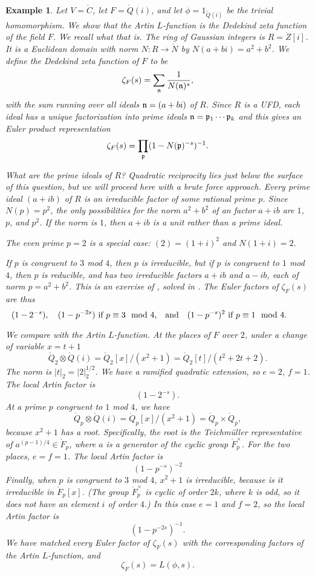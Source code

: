 \documentclass{amsart}
\newtheorem{example}[exercise]{Example}
\def\CC{\ring{C}}
\begin{document}
\begin{example}
Let $V=\CC$, let $F=\ring{Q}(i)$, and let $\phi=1_{\ring{Q}(i)}$ be the trivial
homomorphism.  We show that the Artin $L$-function is the Dedekind zeta
function of the field $F$.  We recall what that is.
The ring of Gaussian integers is $R=\ring{Z}[i]$.  It is a Euclidean domain with
norm $N:R\to\ring{N}$ by $N(a+b i)=a^2 + b^2$.
We define the Dedekind zeta function of $F$ to be
\[
\zeta_F(s) = \sum_{\frak n} \frac{1}{N(\frak n)^s},
\]
with the sum running over all ideals ${\frak n} = (a+b i)$ of $R$. 
Since $R$ is a UFD, each ideal has a unique factorization into prime ideals
${\frak n} = {\frak p}_1\cdots {\frak p}_k$ and this gives an Euler product
representation
\[
\zeta_F(s) = \prod_{\frak p} (1- N({\frak p})^{-s})^{-1}.
\]

What are the prime ideals of $R$?  Quadratic reciprocity lies just
below the surface of this question, but we will proceed here with a brute
force approach.  Every prime ideal $(a+ib)$ of $R$ is an irreducible
factor of some rational prime $p$.  Since $N(p) = p^2$, the only
possibilities for the norm $a^2+b^2$ of an factor $a+ib$ are $1$, $p$,
and $p^2$.  If the norm is $1$, then $a+ib$ is a unit rather than a
prime ideal.

The even prime $p=2$ is a special case: $(2) = (1+i)^2$ and $N(1+i)=2$.  

If $p$ is congruent to $3$ mod $4$, then $p$ is irreducible,
but if $p$ is congruent to $1$ mod $4$, then $p$ is reducible, and
has two irreducible factors $a+ib$ and $a-ib$, each of norm $p=a^2+b^2$.
This is an exercise of \cite[p.~443]{knapp-basic}, solved in \cite{DF}.
The Euler factors of $\zeta_F(s)$ are thus
\[
(1-2^{-s}),\quad (1-p^{-2s}) \text{ if $p\equiv 3 \mod 4$,}
\quad\text{and}\quad (1-p^{-s})^2 \text{ if $p\equiv 1 \mod 4$.\quad\quad}
\]

We compare with the Artin $L$-function.  At the places of $F$ over $2$,
under a change of variable $x = t+1$
\[
\ring{Q}_2 \otimes \ring{Q}(i) = \ring{Q}_2[x]/(x^2+1) 
= \ring{Q}_2[t]/(t^2 + 2t + 2).
\]
The norm is $|t|_2 = |2|_2^{1/2}$.  We have a ramified quadratic
extension, so $e=2$, $f=1$.  The local Artin factor is
\[
(1-2^{-s}).
\]
At a prime $p$ congruent to $1$ mod $4$, we have
\[
\ring{Q}_p \otimes \ring{Q}(i) = \ring{Q}_p[x]/(x^2+1) = \ring{Q}_p\times \ring{Q}_p,
\]
because $x^2+1$ has a root.  Specifically, the root is the Teichm\"uller representative of
$a^{(p-1)/4}\in \ring{F}_p$, where $a$ is a generator of the cyclic
group $\ring{F}^\times_p$.  For the two places, $e=f=1$.  The local
Artin factor is
\[
(1-p^{-s})^{-2}
\]
Finally, when $p$ is congruent to $3$ mod $4$, $x^2+1$ is irreducible,
because is it irreducible in $\ring{F}_p[x]$.  (The group
$\ring{F}^\times_p$ is cyclic of order $2k$, where $k$ is odd, so it
does not have an element $i$ of order $4$.)  In this case $e=1$ and
$f=2$, so the local Artin factor is
\[
(1 - p^{-2s})^{-1}.
\]
We have matched every Euler factor of $\zeta_F(s)$ with the
corresponding factors of the Artin $L$-function, and
\[
\zeta_F(s) = L(\phi,s).
\]
\end{example}
\end{document}
